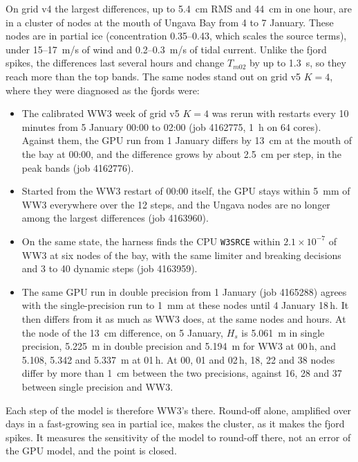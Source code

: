 \documentclass[11pt,a4paper]{article}
\begin{document}
On grid v4 the largest differences, up to \SI{5.4}{cm} RMS and \SI{44}{cm}
in one hour, are in a cluster of nodes at the mouth of Ungava Bay from 4 to
7 January. These nodes are in partial ice (concentration 0.35--0.43, which
scales the source terms), under 15--\SI{17}{m/s} of wind and
0.2--\SI{0.3}{m/s} of tidal current. Unlike the fjord spikes, the
differences last several hours and change $T_{m02}$ by up to \SI{1.3}{s},
so they reach more than the top bands. The same nodes stand out on grid v5
$K=4$, where they were diagnosed as the fjords were:
\begin{itemize}
\item The calibrated WW3 week of grid v5 $K=4$ was rerun with restarts
every 10 minutes from 5 January 00:00 to 02:00 (job 4162775, \SI{1}{h} on
64 cores). Against them, the GPU run from 1 January differs by \SI{13}{cm}
at the mouth of the bay at 00:00, and the difference grows by about
\SI{2.5}{cm} per step, in the peak bands (job 4162776).
\item Started from the WW3 restart of 00:00 itself, the GPU stays within
\SI{5}{mm} of WW3 everywhere over the 12 steps, and the Ungava nodes are no
longer among the largest differences (job 4163960).
\item On the same state, the harness finds the CPU \texttt{W3SRCE} within
$2.1\times10^{-7}$ of WW3 at six nodes of the bay, with the same limiter
and breaking decisions and 3 to 40 dynamic steps (job 4163959).
\item The same GPU run in double precision from 1 January (job 4165288)
agrees with the single-precision run to \SI{1}{mm} at these nodes until
4 January 18\,h. It then differs from it as much as WW3 does, at the same
nodes and hours. At the node of the \SI{13}{cm} difference, on 5 January,
$H_s$ is \SI{5.061}{m}
in single precision, \SI{5.225}{m} in double precision and \SI{5.194}{m}
for WW3 at 00\,h, and 5.108, 5.342 and \SI{5.337}{m} at 01\,h. At 00, 01
and 02\,h, 18, 22 and 38 nodes differ by more than \SI{1}{cm} between the
two precisions, against 16, 28 and 37 between single precision and WW3.
\end{itemize}
Each step of the model is therefore WW3's there. Round-off alone,
amplified over days in a fast-growing sea in partial ice, makes the
cluster, as it makes the fjord spikes. It measures the sensitivity of the
model to round-off there, not an error of the GPU model, and the point is
closed.
\end{document}
